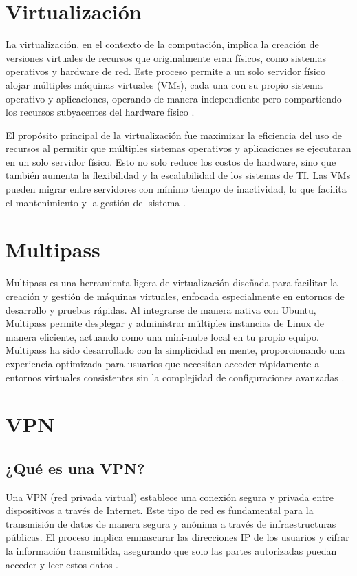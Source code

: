 \section{Virtualización}
La virtualización, en el contexto de la computación, implica la creación de versiones virtuales de recursos que originalmente eran físicos, como sistemas operativos y hardware de red. Este proceso permite a un solo servidor físico alojar múltiples máquinas virtuales (VMs), cada una con su propio sistema operativo y aplicaciones, operando de manera independiente pero compartiendo los recursos subyacentes del hardware físico \cite{Virtualizacion}.

El propósito principal de la virtualización fue maximizar la eficiencia del uso de recursos al permitir que múltiples sistemas operativos y aplicaciones se ejecutaran en un solo servidor físico. Esto no solo reduce los costos de hardware, sino que también aumenta la flexibilidad y la escalabilidad de los sistemas de TI. Las VMs pueden migrar entre servidores con mínimo tiempo de inactividad, lo que facilita el mantenimiento y la gestión del sistema \cite{Virtualizacion2}.

\section{Multipass}
Multipass es una herramienta ligera de virtualización diseñada para facilitar la creación y gestión de máquinas virtuales, enfocada especialmente en entornos de desarrollo y pruebas rápidas. Al integrarse de manera nativa con Ubuntu, Multipass permite desplegar y administrar múltiples instancias de Linux de manera eficiente, actuando como una mini-nube local en tu propio equipo. Multipass ha sido desarrollado con la simplicidad en mente, proporcionando una experiencia optimizada para usuarios que necesitan acceder rápidamente a entornos virtuales consistentes sin la complejidad de configuraciones avanzadas \cite{Multipass}.

\section{VPN}
\subsection{¿Qué es una VPN?}
Una VPN (red privada virtual) establece una conexión segura y privada entre dispositivos a través de Internet. Este tipo de red es fundamental para la transmisión de datos de manera segura y anónima a través de infraestructuras públicas. El proceso implica enmascarar las direcciones IP de los usuarios y cifrar la información transmitida, asegurando que solo las partes autorizadas puedan acceder y leer estos datos \cite{VPN}.

